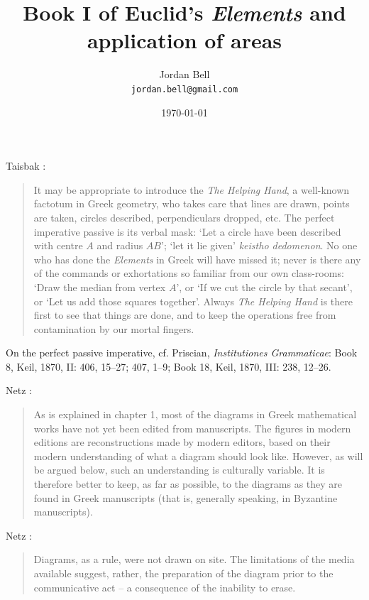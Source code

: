 \documentclass{article}
\begin{document}
\title{Book I of Euclid's {\em Elements} and application of areas} 
\author{Jordan Bell\\ \texttt{jordan.bell@gmail.com}}
\date{\today}

\maketitle

Taisbak \cite[pp.~28--29]{data}:

\begin{quote}
It may be appropriate to introduce the {\em The Helping Hand}, a well-known factotum in Greek
geometry, who takes care that lines are drawn, points are taken, circles described,
perpendiculars dropped, etc. The perfect imperative passive is its verbal mask: `Let a
circle have been described with centre $A$ and radius $AB$'; `let it lie given' {\em keistho
dedomenon}. No one who has done the {\em Elements} in Greek will have missed it; never is
there any of the commands or exhortations so familiar from our own class-rooms:
`Draw the median from vertex $A$', or `If we cut the circle by that secant', or `Let us add
those squares together'. Always {\em The Helping Hand} is there first to see that things are
done, and to keep the operations free from contamination by our mortal fingers.
\end{quote}

On the perfect passive imperative, cf.
Priscian, {\em Institutiones Grammaticae}: Book 8, Keil, 1870, II: 406, 15--27; 407, 1--9;
Book 18, Keil, 1870, III: 238, 12--26.






Netz \cite[p.~xvii]{netz}:

\begin{quote}
As is explained in chapter 1, most of the diagrams in Greek mathematical
works have not yet been edited from manuscripts. The figures
in modern editions are reconstructions made by modern editors, based
on their modern understanding of what a diagram should look like.
However, as will be argued below, such an understanding is culturally
variable. It is therefore better to keep, as far as possible, to the diagrams
as they are found in Greek manuscripts (that is, generally
speaking, in Byzantine manuscripts).
\end{quote}

Netz \cite[p.~16]{netz}:

\begin{quote}
Diagrams, as a rule, were not drawn on site.
The limitations of the media available suggest, rather, the preparation
of the diagram prior to the communicative act -- a consequence of the
inability to erase.
\end{quote}
\end{document}
